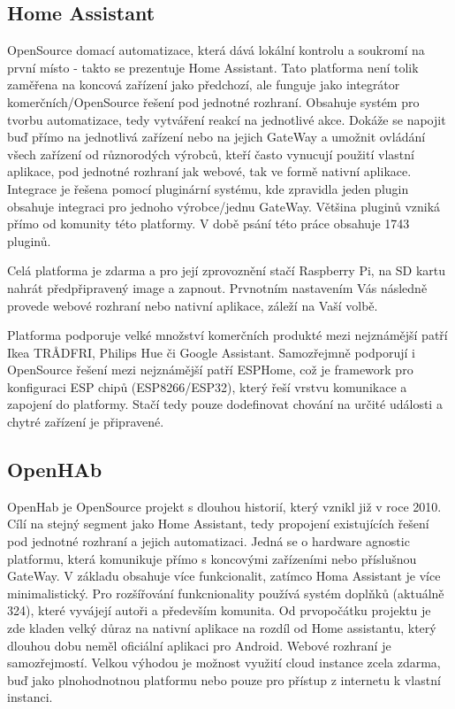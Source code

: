 \documentclass[thesis=B,czech]{FITthesis}[2019/12/23]
\begin{document}
\subsection{Home Assistant}
OpenSource domací automatizace, která dává lokální kontrolu a soukromí na první místo - takto se prezentuje Home Assistant. Tato platforma není tolik zaměřena na koncová zařízení jako předchozí, ale funguje jako integrátor komerčních/OpenSource řešení pod jednotné rozhraní. Obsahuje systém pro tvorbu automatizace, tedy vytváření reakcí na jednotlivé akce. Dokáže se napojit buď přímo na jednotlivá zařízení nebo na jejich GateWay a umožnit ovládání všech zařízení od různorodých výrobců, kteří často vynucují použití vlastní aplikace, pod jednotné rozhraní jak webové, tak ve formě nativní aplikace. Integrace je řešena pomocí pluginární systému, kde zpravidla jeden plugin obsahuje integraci pro jednoho výrobce/jednu GateWay. Většina pluginů vzniká přímo od komunity této platformy. V době psání této práce obsahuje 1743 pluginů.

Celá platforma je zdarma a pro její zprovoznění stačí Raspberry Pi, na SD kartu nahrát předpřipravený image a zapnout. Prvnotním nastavením Vás následně provede webové rozhraní nebo nativní aplikace, záleží na Vaší volbě. 

Platforma podporuje velké množství komerčních produkté mezi nejznámější patří Ikea TRÅDFRI, Philips Hue či Google Assistant. Samozřejmně podporují i OpenSource řešení mezi nejznámější patří ESPHome, což je framework pro konfiguraci ESP chipů (ESP8266/ESP32), který řeší vrstvu komunikace a zapojení do platformy. Stačí tedy pouze dodefinovat chování na určité události a chytré zařízení je připravené.

\subsection{OpenHAb}
OpenHab je OpenSource projekt s dlouhou historií, který vznikl již v roce 2010. Cílí na stejný segment jako Home Assistant, tedy  propojení existujících řešení pod jednotné rozhraní a jejich automatizaci. Jedná se o hardware agnostic platformu, která komunikuje přímo s koncovými zařízeními nebo příslušnou GateWay. V základu obsahuje více funkcionalit, zatímco Homa Assistant je více minimalistický. Pro rozšířování funkcnionality používá systém doplňků (aktuálně 324), které vyvájejí autoři a především komunita. Od prvopočátku projektu je zde kladen velký důraz na nativní aplikace na rozdíl od Home assistantu, který dlouhou dobu neměl oficiální aplikaci pro Android. Webové rozhraní je samozřejmostí. Velkou výhodou je možnost využití cloud instance zcela zdarma, buď jako plnohodnotnou platformu nebo pouze pro přístup z internetu k vlastní instanci.
\end{document}
